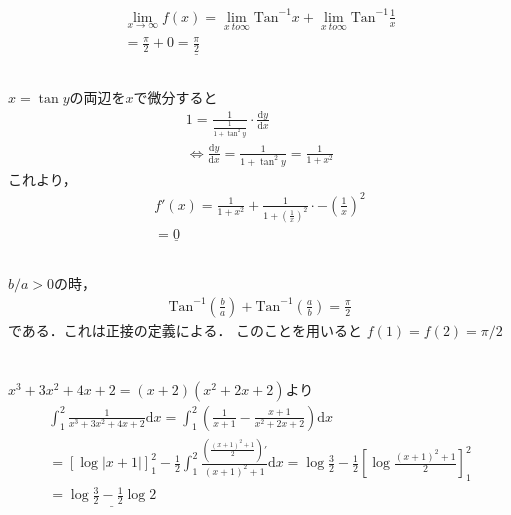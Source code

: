 \documentclass[dvipdfmx]{jsarticle}
\begin{document}
  \section{}
    \subsection{}
      \begin{align*}
        \lim_{x \to \infty} f(x) = \lim_{x \ to \infty} \mathrm{Tan}^{-1} x + \lim_{x \ to \infty} \mathrm{Tan}^{-1} \frac{1}{x}\\
        = \frac{\pi}{2} + 0 = \underline{\frac{\pi}{2}}
      \end{align*}
    \subsection{}
      $x = \tan y$の両辺を$x$で微分すると
      \begin{align*}
        1 = \frac{1}{\frac{1}{1 + \tan^2 y}} \cdot \frac{\mathrm{d}y}{\mathrm{d}x}\\
        \Leftrightarrow \frac{\mathrm{d}y}{\mathrm{d}x} = \frac{1}{1 +\tan^2 y} = \frac{1}{1 + x^2}
      \end{align*}
      これより，
      \begin{align*}
        f'(x) = \frac{1}{1 + x^2} + \frac{1}{1+\left(\frac{1}{x}\right)^2}\cdot -\left(\frac{1}{x}\right)^2\\
        = \underline{0}
      \end{align*}
    \subsection{}
      $b/a > 0$の時，
      \begin{align*}
        \mathrm{Tan}^{-1} \left(\frac{b}{a}\right) + \mathrm{Tan}^{-1} \left(\frac{a}{b}\right) = \frac{\pi}{2}
      \end{align*}
      である．これは正接の定義による．
      このことを用いると
      $f(1) = f(2) = \pi / 2$
  \section{}
      $x^3 + 3x^2 + 4x + 2 = (x + 2)(x^2 + 2x + 2)$より
      \begin{align*}
        \int_{1}^{2} \frac{1}{x^3 + 3x^2 + 4x + 2} \mathrm{d}x 
        = \int_{1}^{2} \left(\frac{1}{x + 1} - \frac{x + 1}{x^2 + 2x + 2}\right) \mathrm{d}x\\
        = \left[\log |x + 1|\right]_{1}^{2} -\frac{1}{2}\int_{1}^{2} \frac{\left(\frac{(x+1)^2 + 1}{2}\right)'}{(x+1)^2 + 1}\mathrm{d}x
        = \log \frac{3}{2} - \frac{1}{2} \left[\log \frac{(x+1)^2 + 1}{2}\right]_{1}^{2}\\
        = \underline{\log \frac{3}{2} - \frac{1}{2}\log 2}
      \end{align*}
\end{document}
